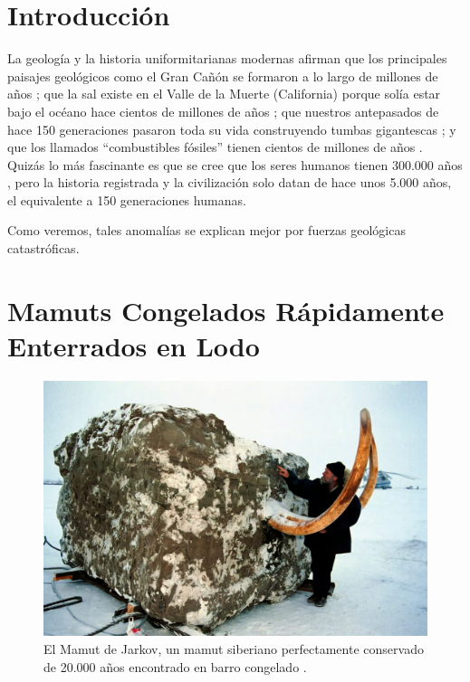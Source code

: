 \documentclass[10pt,twocolumn,letterpaper]{article}
\begin{document}

\section{Introducción}

La geología y la historia uniformitarianas modernas afirman que los principales paisajes geológicos como el Gran Cañón se formaron a lo largo de millones de años \cite{143}; que la sal existe en el Valle de la Muerte (California) porque solía estar bajo el océano hace cientos de millones de años \cite{144}; que nuestros antepasados de hace 150 generaciones pasaron toda su vida construyendo tumbas gigantescas \cite{29,70}; y que los llamados “combustibles fósiles” tienen cientos de millones de años \cite{104}. Quizás lo más fascinante es que se cree que los seres humanos tienen 300.000 años \cite{145}, pero la historia registrada y la civilización solo datan de hace unos 5.000 años, el equivalente a 150 generaciones humanas.

Como veremos, tales anomalías se explican mejor por fuerzas geológicas catastróficas.

\section{Mamuts Congelados Rápidamente Enterrados en Lodo}

\begin{figure}[t]
\begin{center}
   \includegraphics[width=1\linewidth]{jarkov-mammoth.jpg}
\end{center}
   \caption{El Mamut de Jarkov, un mamut siberiano perfectamente conservado de 20.000 años encontrado en barro congelado \cite{51}.}
\label{fig:1}
\label{fig:onecol}
\end{figure}
\end{document}
